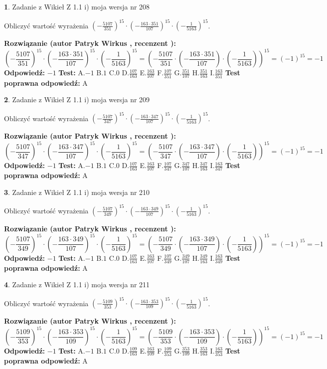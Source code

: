\documentclass[12pt, a4paper]{article}
\theoremstyle{definition} %
\newtheorem{zad}{}
\newcommand{\zadStart}[1]{\begin{zad}#1\newline}
\newcommand{\zadStop}{\end{zad}}
\newcommand{\rozwStart}[2]{\noindent \textbf{Rozwiązanie (autor #1 , recenzent #2): }\newline}
\newcommand{\rozwStop}{\newline}
\newcommand{\odpStart}{\noindent \textbf{Odpowiedź:}\newline}
\newcommand{\odpStop}{\newline}
\newcommand{\testStart}{\noindent \textbf{Test:}\newline}
\newcommand{\testStop}{\newline}
\newcommand{\kluczStart}{\noindent \textbf{Test poprawna odpowiedź:}\newline}
\newcommand{\kluczStop}{\newline}
\begin{document}
\zadStart{Zadanie z Wikieł Z 1.1 i) moja wersja nr 208}

Obliczyć wartość wyrażenia $(-\frac{5107}{351})^{15} \cdot (-\frac{163 \cdot 351}{107})^{15} \cdot (-\frac{1}{5163})^{15}$.
\zadStop
\rozwStart{Patryk Wirkus}{}
$$(-\frac{5107}{351})^{15} \cdot (-\frac{163 \cdot 351}{107})^{15} \cdot (-\frac{1}{5163})^{15} = (-\frac{5107}{351} \cdot (-\frac{163 \cdot 351}{107}) \cdot (-\frac{1}{5163}))^{15} = (-1)^{15} = -1$$
\rozwStop
\odpStart
$-1$
\odpStop
\testStart
A.$-1$ B.$1$ C.$0$ D.$\frac{107}{163}$ E.$\frac{163}{107}$
F.$\frac{107}{351}$ G.$\frac{351}{107}$
H.$\frac{351}{163}$
I.$\frac{163}{351}$
\testStop
\kluczStart
A
\kluczStop



\zadStart{Zadanie z Wikieł Z 1.1 i) moja wersja nr 209}

Obliczyć wartość wyrażenia $(-\frac{5107}{347})^{15} \cdot (-\frac{163 \cdot 347}{107})^{15} \cdot (-\frac{1}{5163})^{15}$.
\zadStop
\rozwStart{Patryk Wirkus}{}
$$(-\frac{5107}{347})^{15} \cdot (-\frac{163 \cdot 347}{107})^{15} \cdot (-\frac{1}{5163})^{15} = (-\frac{5107}{347} \cdot (-\frac{163 \cdot 347}{107}) \cdot (-\frac{1}{5163}))^{15} = (-1)^{15} = -1$$
\rozwStop
\odpStart
$-1$
\odpStop
\testStart
A.$-1$ B.$1$ C.$0$ D.$\frac{107}{163}$ E.$\frac{163}{107}$
F.$\frac{107}{347}$ G.$\frac{347}{107}$
H.$\frac{347}{163}$
I.$\frac{163}{347}$
\testStop
\kluczStart
A
\kluczStop



\zadStart{Zadanie z Wikieł Z 1.1 i) moja wersja nr 210}

Obliczyć wartość wyrażenia $(-\frac{5107}{349})^{15} \cdot (-\frac{163 \cdot 349}{107})^{15} \cdot (-\frac{1}{5163})^{15}$.
\zadStop
\rozwStart{Patryk Wirkus}{}
$$(-\frac{5107}{349})^{15} \cdot (-\frac{163 \cdot 349}{107})^{15} \cdot (-\frac{1}{5163})^{15} = (-\frac{5107}{349} \cdot (-\frac{163 \cdot 349}{107}) \cdot (-\frac{1}{5163}))^{15} = (-1)^{15} = -1$$
\rozwStop
\odpStart
$-1$
\odpStop
\testStart
A.$-1$ B.$1$ C.$0$ D.$\frac{107}{163}$ E.$\frac{163}{107}$
F.$\frac{107}{349}$ G.$\frac{349}{107}$
H.$\frac{349}{163}$
I.$\frac{163}{349}$
\testStop
\kluczStart
A
\kluczStop



\zadStart{Zadanie z Wikieł Z 1.1 i) moja wersja nr 211}

Obliczyć wartość wyrażenia $(-\frac{5109}{353})^{15} \cdot (-\frac{163 \cdot 353}{109})^{15} \cdot (-\frac{1}{5163})^{15}$.
\zadStop
\rozwStart{Patryk Wirkus}{}
$$(-\frac{5109}{353})^{15} \cdot (-\frac{163 \cdot 353}{109})^{15} \cdot (-\frac{1}{5163})^{15} = (-\frac{5109}{353} \cdot (-\frac{163 \cdot 353}{109}) \cdot (-\frac{1}{5163}))^{15} = (-1)^{15} = -1$$
\rozwStop
\odpStart
$-1$
\odpStop
\testStart
A.$-1$ B.$1$ C.$0$ D.$\frac{109}{163}$ E.$\frac{163}{109}$
F.$\frac{109}{353}$ G.$\frac{353}{109}$
H.$\frac{353}{163}$
I.$\frac{163}{353}$
\testStop
\kluczStart
A
\kluczStop
\end{document}
